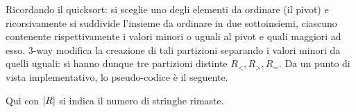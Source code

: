 \documentclass{subfiles}
\begin{document}
Ricordando il quicksort: si sceglie uno degli elementi da ordinare (il pivot) e ricorsivamente si suddivide l'insieme da ordinare in due sottoinsiemi,
ciascuno contenente rispettivamente i valori minori o uguali al pivot e quali maggiori ad esso.
3-way modifica la creazione di tali partizioni separando i valori minori da quelli uguali: si hanno dunque tre partizioni distinte \(R_{<}, R_{>}, R_{=}\).
Da un punto di vista implementativo, lo pseudo-codice è il seguente.


\noindent Qui con \(\left\vert {R} \right\vert\) si indica il numero di stringhe rimaste.
\end{document}
